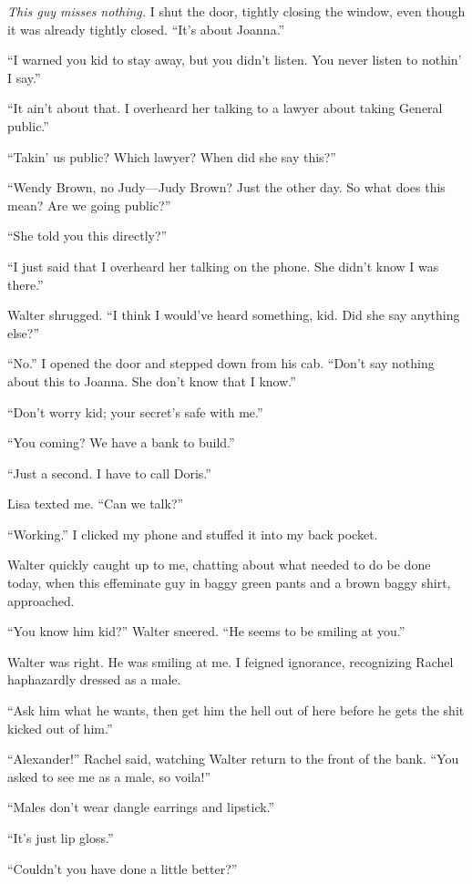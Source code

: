 \emph{This guy misses nothing.} I shut the door, tightly closing the
window, even though it was already tightly closed. ``It's about
Joanna.''

``I warned you kid to stay away, but you didn't listen. You never listen
to nothin' I say.''

``It ain't about that. I overheard her talking to a lawyer about taking
General public.''

``Takin' us public? Which lawyer? When did she say this?''

``Wendy Brown, no Judy---Judy Brown? Just the other day. So what does
this mean? Are we going public?''

``She told you this directly?''

``I just said that I overheard her talking on the phone. She didn't know
I was there.''

Walter shrugged. ``I think I would've heard something, kid. Did she say
anything else?''

``No.'' I opened the door and stepped down from his cab. ``Don't say
nothing about this to Joanna. She don't know that I know.''

``Don't worry kid; your secret's safe with me.''

``You coming? We have a bank to build.''

``Just a second. I have to call Doris.''

Lisa texted me. ``Can we talk?''

``Working.'' I clicked my phone and stuffed it into my back pocket.

Walter quickly caught up to me, chatting about what needed to do be done
today, when this effeminate guy in baggy green pants and a brown baggy
shirt, approached.

``You know him kid?'' Walter sneered. ``He seems to be smiling at you.''

Walter was right. He was smiling at me. I feigned ignorance, recognizing
Rachel haphazardly dressed as a male.

``Ask him what he wants, then get him the hell out of here before he
gets the shit kicked out of him.''

``Alexander!'' Rachel said, watching Walter return to the front of the
bank. ``You asked to see me as a male, so voila!''

``Males don't wear dangle earrings and lipstick.''

``It's just lip gloss.''

``Couldn't you have done a little better?''

